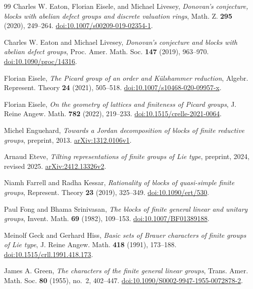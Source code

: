 \begin{thebibliography}{99}
Charles W. Eaton, Florian Eisele, and Michael Livesey,
\emph{Donovan's conjecture, blocks with abelian defect groups and discrete
valuation rings},
Math. Z. \textbf{295} (2020), 249--264.
\href{https://doi.org/10.1007/s00209-019-02354-1}{doi:10.1007/s00209-019-02354-1}.

Charles W. Eaton and Michael Livesey,
\emph{Donovan's conjecture and blocks with abelian defect groups},
Proc. Amer. Math. Soc. \textbf{147} (2019), 963--970.
\href{https://doi.org/10.1090/proc/14316}{doi:10.1090/proc/14316}.

Florian Eisele,
\emph{The Picard group of an order and K\"ulshammer reduction},
Algebr. Represent. Theory \textbf{24} (2021), 505--518.
\href{https://doi.org/10.1007/s10468-020-09957-x}{doi:10.1007/s10468-020-09957-x}.

Florian Eisele,
\emph{On the geometry of lattices and finiteness of Picard groups},
J. Reine Angew. Math. \textbf{782} (2022), 219--233.
\href{https://doi.org/10.1515/crelle-2021-0064}{doi:10.1515/crelle-2021-0064}.

Michel Enguehard,
\emph{Towards a Jordan decomposition of blocks of finite reductive groups},
preprint, 2013.
\href{https://arxiv.org/abs/1312.0106v1}{arXiv:1312.0106v1}.

Arnaud Eteve,
\emph{Tilting representations of finite groups of Lie type},
preprint, 2024, revised 2025.
\href{https://arxiv.org/abs/2412.13326v2}{arXiv:2412.13326v2}.

Niamh Farrell and Radha Kessar,
\emph{Rationality of blocks of quasi-simple finite groups},
Represent. Theory \textbf{23} (2019), 325--349.
\href{https://doi.org/10.1090/ert/530}{doi:10.1090/ert/530}.

Paul Fong and Bhama Srinivasan,
\emph{The blocks of finite general linear and unitary groups},
Invent. Math. \textbf{69} (1982), 109--153.
\href{https://doi.org/10.1007/BF01389188}{doi:10.1007/BF01389188}.

Meinolf Geck and Gerhard Hiss,
\emph{Basic sets of Brauer characters of finite groups of Lie type},
J. Reine Angew. Math. \textbf{418} (1991), 173--188.
\href{https://doi.org/10.1515/crll.1991.418.173}{doi:10.1515/crll.1991.418.173}.

James A. Green,
\emph{The characters of the finite general linear groups},
Trans. Amer. Math. Soc. \textbf{80} (1955), no.~2, 402--447.
\href{https://doi.org/10.1090/S0002-9947-1955-0072878-2}{doi:10.1090/S0002-9947-1955-0072878-2}.


\end{thebibliography}
